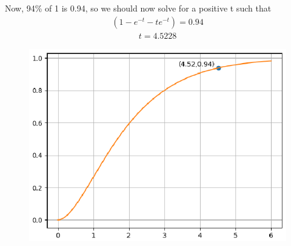 Now, 94\% of 1 is 0.94, so we should now solve for a positive t such that
\begin{multline}
(1 - e^{-t} - te^{-t}) = 0.94
\end{multline}
\begin{multline}
 t = 4.5228
\end{multline}
\begin{figure}
\includegraphics[scale=0.65]{./figs/ee18btech11002.eps}

\end{figure}
%

